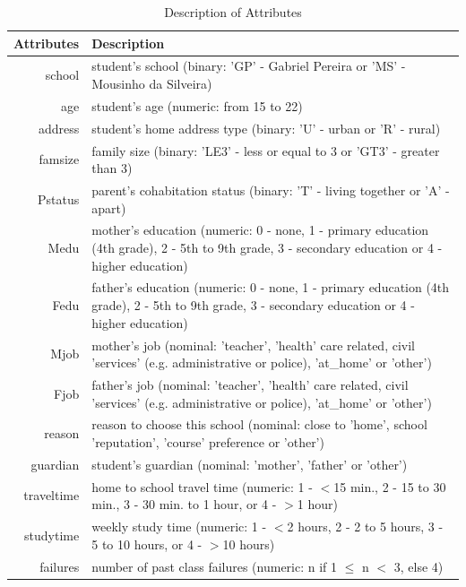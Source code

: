 \documentclass[conference]{IEEEtran}
\begin{document}

\begin{table}[!t]
\renewcommand{\arraystretch}{1.3}
\caption{Description of Attributes}
\label{table:attr-descr}
\centering
\begin{tabular}{|r || l|}
\hline
\bfseries Attributes & \bfseries Description \\
\hline\hline
school & student's school (binary: 'GP' - Gabriel Pereira or 'MS' - Mousinho da Silveira)\\
age & student's age (numeric: from 15 to 22)\\
address & student's home address type (binary: 'U' - urban or 'R' - rural)\\
famsize & family size (binary: 'LE3' - less or equal to 3 or 'GT3' - greater than 3)\\
Pstatus & parent's cohabitation status (binary: 'T' - living together or 'A' - apart)\\
Medu & mother's education (numeric: 0 - none, 1 - primary education (4th grade), 2 - 5th to 9th grade, 3 - secondary education or 4 - higher education)\\
Fedu & father's education (numeric: 0 - none, 1 - primary education (4th grade), 2 - 5th to 9th grade, 3 - secondary education or 4 - higher education)\\
Mjob & mother's job (nominal: 'teacher', 'health' care related, civil 'services' (e.g. administrative or police), 'at\_home' or 'other')\\
Fjob & father's job (nominal: 'teacher', 'health' care related, civil 'services' (e.g. administrative or police), 'at\_home' or 'other')\\
reason & reason to choose this school (nominal: close to 'home', school 'reputation', 'course' preference or 'other')\\
guardian & student's guardian (nominal: 'mother', 'father' or 'other')\\
traveltime & home to school travel time (numeric: 1 - $<$15 min., 2 - 15 to 30 min., 3 - 30 min. to 1 hour, or 4 - $>$1 hour)\\
studytime & weekly study time (numeric: 1 - $<$2 hours, 2 - 2 to 5 hours, 3 - 5 to 10 hours, or 4 - $>$10 hours)\\
failures & number of past class failures (numeric: n if 1 $\leq$ n $<$ 3, else 4)\\

\end{tabular}
\end{table}
\end{document}
